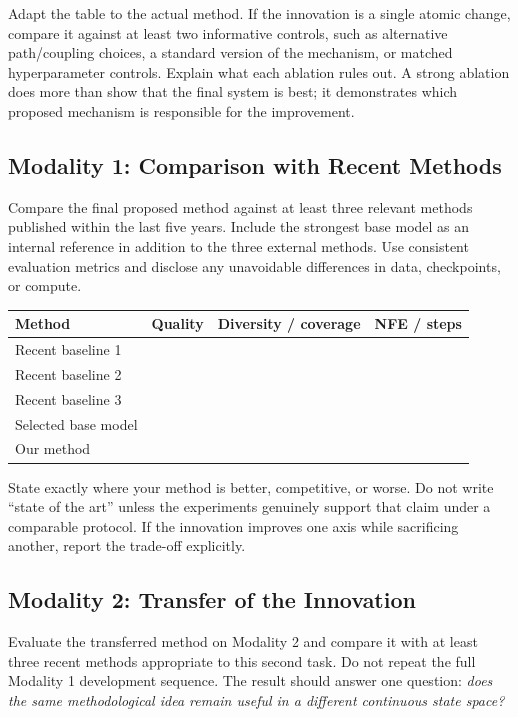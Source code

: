 \documentclass{article}
\begin{document}
Adapt the table to the actual method. If the innovation is a single atomic change, compare it against at least two informative controls, such as alternative path/coupling choices, a standard version of the mechanism, or matched hyperparameter controls. Explain what each ablation rules out. A strong ablation does more than show that the final system is best; it demonstrates which proposed mechanism is responsible for the improvement.

\subsection{Modality 1: Comparison with Recent Methods}

Compare the final proposed method against at least three relevant methods published within the last five years. Include the strongest base model as an internal reference in addition to the three external methods. Use consistent evaluation metrics and disclose any unavoidable differences in data, checkpoints, or compute.

\begin{center}
\small
\begin{tabular}{lccc}
\toprule
Method & Quality & Diversity / coverage & NFE / steps \\
\midrule
Recent baseline 1 & & & \\
Recent baseline 2 & & & \\
Recent baseline 3 & & & \\
Selected base model & & & \\
Our method & & & \\
\bottomrule
\end{tabular}
\end{center}

State exactly where your method is better, competitive, or worse. Do not write ``state of the art'' unless the experiments genuinely support that claim under a comparable protocol. If the innovation improves one axis while sacrificing another, report the trade-off explicitly.

\subsection{Modality 2: Transfer of the Innovation}

Evaluate the transferred method on Modality 2 and compare it with at least three recent methods appropriate to this second task. Do not repeat the full Modality 1 development sequence. The result should answer one question: \emph{does the same methodological idea remain useful in a different continuous state space?}
\end{document}
